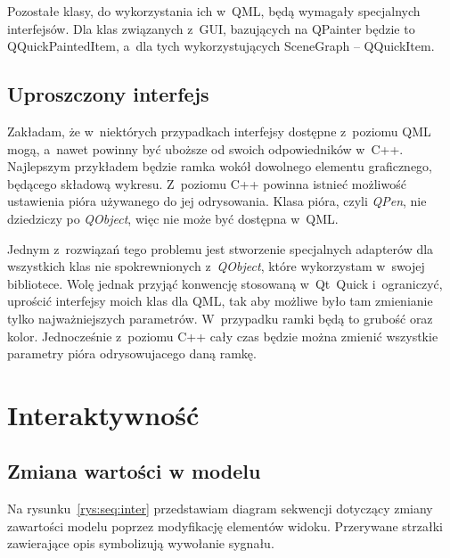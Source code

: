 Pozostałe klasy, do wykorzystania ich w~QML, będą wymagały specjalnych interfejsów. Dla klas związanych z~GUI, bazujących na QPainter będzie to QQuickPaintedItem, a~dla tych wykorzystujących SceneGraph -- QQuickItem.

\subsection{Uproszczony interfejs}
Zakładam, że w~niektórych przypadkach interfejsy dostępne z~poziomu QML mogą, a~nawet powinny być uboższe od swoich odpowiedników w~C++. Najlepszym przykładem będzie ramka wokół dowolnego elementu graficznego, będącego składową wykresu. Z~poziomu C++ powinna istnieć możliwość ustawienia pióra używanego do jej odrysowania. Klasa pióra, czyli \textit{QPen}, nie dziedziczy po \textit{QObject}, więc nie może być dostępna w~QML.

Jednym z~rozwiązań tego problemu jest stworzenie specjalnych adapterów dla wszystkich klas nie spokrewnionych z~\textit{QObject}, które wykorzystam w~swojej bibliotece. Wolę jednak przyjąć konwencję stosowaną w~Qt~Quick i~ograniczyć, uprościć interfejsy moich klas dla QML, tak aby możliwe było tam zmienianie tylko najważniejszych parametrów. W~przypadku ramki będą to grubość oraz kolor. Jednocześnie z~poziomu C++ cały czas będzie można zmienić wszystkie parametry pióra odrysowujacego daną ramkę.

\section{Interaktywność}

\subsection{Zmiana wartości w modelu}
Na rysunku~\ref{rys:seq:inter} przedstawiam diagram sekwencji dotyczący zmiany zawartości modelu poprzez modyfikację elementów widoku. Przerywane strzałki zawierające opis symbolizują wywołanie sygnału.

